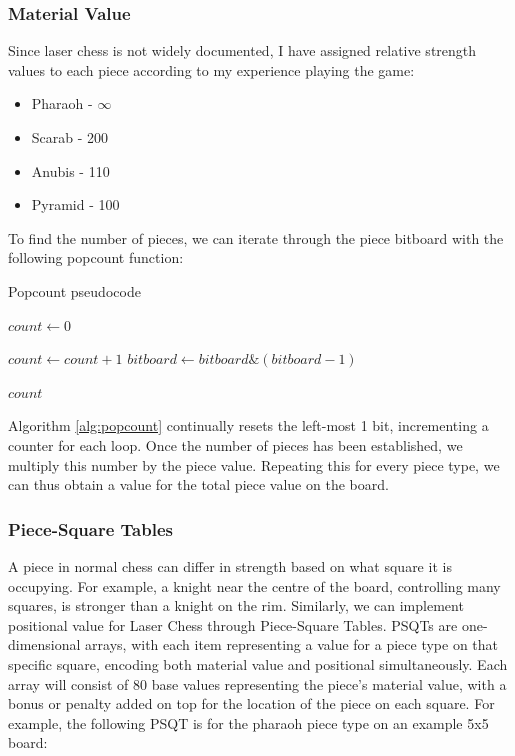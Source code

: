 \documentclass[../main/main.tex]{subfiles}
\begin{document}
\subsubsection*{Material Value}
Since laser chess is not widely documented, I have assigned relative strength values to each piece according to my experience playing the game:

\begin{itemize}
\item Pharaoh - $\infty$
\item Scarab - 200
\item Anubis - 110
\item Pyramid - 100
\end{itemize}

To find the number of pieces, we can iterate through the piece bitboard with the following popcount function:

\begin{algorithm}[H]
\caption{Popcount pseudocode}
\label{alg:popcount}
\begin{algorithmic}
    \State $count \gets 0$

        \State $count \gets count + 1$
        \State $bitboard \gets bitboard \& (bitboard - 1)$
    \EndWhile

    \State \Return $count$
    \EndFunction
\end{algorithmic}
\end{algorithm}

Algorithm \ref{alg:popcount} continually resets the left-most 1 bit, incrementing a counter for each loop. Once the number of pieces has been established, we multiply this number by the piece value. Repeating this for every piece type, we can thus obtain a value for the total piece value on the board.

\subsubsection*{Piece-Square Tables}
A piece in normal chess can differ in strength based on what square it is occupying. For example, a knight near the centre of the board, controlling many squares, is stronger than a knight on the rim. Similarly, we can implement positional value for Laser Chess through Piece-Square Tables. PSQTs are one-dimensional arrays, with each item representing a value for a piece type on that specific square, encoding both material value and positional simultaneously. Each array will consist of 80 base values representing the piece’s material value, with a bonus or penalty added on top for the location of the piece on each square. For example, the following PSQT is for the pharaoh piece type on an example 5x5 board:
\end{document}
